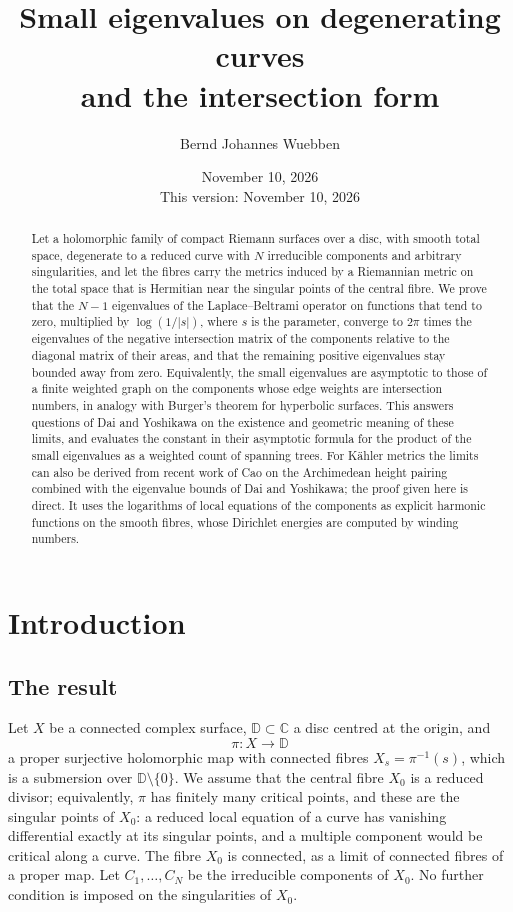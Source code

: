 \documentclass[11pt]{amsart}
\title[Small eigenvalues on degenerating curves]{Small eigenvalues on degenerating curves\\and the intersection form}
\author{Bernd Johannes Wuebben}
\date{November 10, 2026\\This version: November 10, 2026}
\theoremstyle{definition}
\theoremstyle{remark}
\newcommand{\CC}{\mathbb C}
\begin{document}
\begin{abstract}
Let a holomorphic family of compact Riemann surfaces over a disc, with
smooth total space, degenerate to a reduced curve with $N$ irreducible
components and arbitrary singularities, and let the fibres carry the
metrics induced by a Riemannian metric on the total space that is
Hermitian near the singular points of the central fibre. We prove that
the $N-1$ eigenvalues of the Laplace--Beltrami operator on functions that
tend to zero, multiplied by $\log(1/|s|)$, where $s$ is the parameter,
converge to $2\pi$ times the eigenvalues
of the negative intersection matrix of the components relative to the
diagonal matrix of their areas, and that the remaining positive
eigenvalues stay bounded away from zero. Equivalently, the small
eigenvalues are asymptotic to those of a finite weighted graph on the
components whose edge weights are intersection numbers, in analogy with
Burger's theorem for hyperbolic surfaces. This answers questions of Dai
and Yoshikawa on the existence and geometric meaning of these limits, and
evaluates the constant in their asymptotic formula for the product of the
small eigenvalues as a weighted count of spanning trees. For K\"ahler
metrics the limits can also be derived from recent work of Cao on the
Archimedean height pairing combined with the eigenvalue bounds of Dai and
Yoshikawa; the proof given here is direct. It uses the logarithms of local equations of the components
as explicit harmonic functions on the smooth fibres, whose Dirichlet
energies are computed by winding numbers.
\end{abstract}
\maketitle

\section{Introduction}\label{sec:intro}

\subsection{The result}
Let $X$ be a connected complex surface, $\mathbb D\subset\CC$ a disc centred
at the origin, and
\[
 \pi:X\longrightarrow\mathbb D
\]
a proper surjective holomorphic map with connected fibres $X_s=\pi^{-1}(s)$,
which is a submersion over $\mathbb D\setminus\{0\}$. We assume that the
central fibre $X_0$ is a reduced divisor; equivalently, $\pi$ has finitely
many critical points, and these are the singular points of $X_0$: a
reduced local equation of a curve has vanishing differential exactly at
its singular points, and a multiple component would be critical along a
curve. The fibre $X_0$ is connected, as a limit of connected fibres of a
proper map. Let
$C_1,\ldots,C_N$ be the irreducible components of $X_0$. No further
condition is imposed on the singularities of $X_0$.
\end{document}
